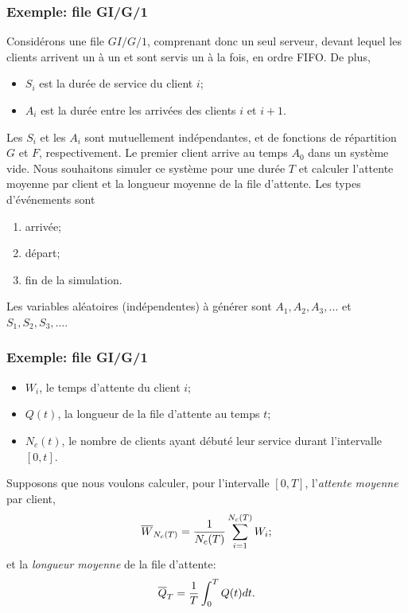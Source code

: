 \documentclass[t,usepdftitle=false]{beamer}
\begin{document}
\begin{frame}
\frametitle{Exemple: file GI/G/1}

Considérons une file $GI/G/1$, comprenant
donc un seul serveur, devant lequel les clients arrivent un à un et
sont servis un à la fois, en ordre FIFO.
De plus,
\begin{itemize}
\item
${S_i}$ est la durée de service du client $i$;
\item
${A_i}$ est la durée entre les arrivées des clients $i$ et $i+1$.
\end{itemize}
Les $S_i$ et les $A_i$ sont mutuellement indépendantes, et de
fonctions de répartition ${G}$ et ${F}$, respectivement.
Le premier client arrive au temps ${A_0}$ dans un système vide.
Nous souhaitons simuler ce système pour une durée ${T}$ et calculer
l'attente moyenne par client et la longueur moyenne de la file d'attente.
Les types d'événements sont
\begin{enumerate}
\item
arrivée;
\item
départ;
\item
fin de la simulation.
\end{enumerate}
Les variables aléatoires (indépendentes) à générer sont $A_1, A_2,
A_3, \dots$ et $S_1, S_2, S_3, \dots$.

\end{frame}

\begin{frame}
\frametitle{Exemple: file GI/G/1}

\begin{itemize}
\item
${W_i}$, le temps d'attente du client $i$;
\item
${Q(t)}$, la longueur de la file d'attente au temps $t$;
\item
${N_c(t)}$, le nombre de clients ayant débuté leur service durant l'intervalle $[0,t]$.
\end{itemize}
Supposons que nous voulons calculer, pour l'intervalle $[0,T]$,
l'\emph{attente moyenne} par client,
\[
 {\overline{W}_{N_c(T)}} = {1\over N_c(T)} \sum_{i=1}^{N_c(T)} W_i;
\]
et la \emph{longueur moyenne} de la file d'attente:
\[
 {\overline{Q}_T} = {1\over T} \int_0^T Q(t) dt.
\]

\end{frame}
\end{document}
